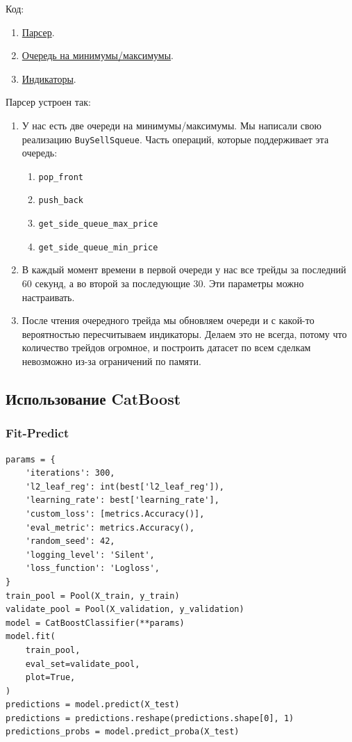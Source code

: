 Код:
\begin{enumerate}
\item \href{https://github.com/dexety/dex-trading-system/blob/main/research/lp-0004-trades-volume/parse/parse_trades_data.py}{Парсер}. 
\item \href{https://github.com/dexety/dex-trading-system/blob/main/utils/buy_sell_queue.py}{Очередь на минимумы/максимумы}.
\item \href{https://github.com/dexety/dex-trading-system/blob/main/utils/indicators.py}{Индикаторы}.
\end{enumerate}


Парсер устроен так:

\begin{enumerate}

\item У нас есть две очереди на минимумы/максимумы. Мы написали свою реализацию \texttt{BuySellSqueue}. Часть операций, которые поддерживает эта очередь:
\begin{enumerate}
    \item \texttt{pop\_front}
    \item \texttt{push\_back}
    \item \texttt{get\_side\_queue\_max\_price}
    \item \texttt{get\_side\_queue\_min\_price}
\end{enumerate}

\item В каждый момент времени в первой очереди у нас все трейды за последний 60 секунд, а во второй за последующие 30. Эти параметры можно настраивать. 
\item После чтения очередного трейда мы обновляем очереди и с какой-то вероятностью пересчитываем индикаторы. Делаем это не всегда, потому что количество трейдов огромное, и построить датасет по всем сделкам невозможно из-за ограничений по памяти.
    
\end{enumerate}


\subsection{Использование CatBoost}

\subsubsection{Fit-Predict}

\begin{verbatim}
params = {
    'iterations': 300,
    'l2_leaf_reg': int(best['l2_leaf_reg']),
    'learning_rate': best['learning_rate'],
    'custom_loss': [metrics.Accuracy()],
    'eval_metric': metrics.Accuracy(),
    'random_seed': 42,
    'logging_level': 'Silent',
    'loss_function': 'Logloss',
}
train_pool = Pool(X_train, y_train)
validate_pool = Pool(X_validation, y_validation)
model = CatBoostClassifier(**params)
model.fit(
    train_pool,
    eval_set=validate_pool,
    plot=True,
)
predictions = model.predict(X_test)
predictions = predictions.reshape(predictions.shape[0], 1)
predictions_probs = model.predict_proba(X_test)
\end{verbatim}

